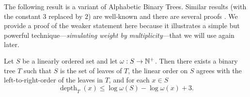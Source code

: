 \documentclass{patmorin}
\renewcommand{\le}{\leqslant}
\newcommand{\pat}[1]{\textcolor{Magenta}{PaMo: #1}}
\newcommand{\piotr}[1]{\textcolor{red}{PiMi: #1}}
\DeclareMathOperator{\depth}{depth}
\newcommand{\defin}[1]{\emph{\textcolor{brightmaroon}{#1}}}
\begin{document}
  The following result is a variant of Alphabetic Binary Trees. Similar results (with the constant $3$ replaced by $2$) are well-known and there are several proofs \cite{knuth:art_iii,mehlhorn:nearly,gilbert.moore:variable_length}. We provide a proof of the weaker statement here because it illustrates a simple but powerful technique---\defin{simulating weight by multiplicity}---that we will use again later.

   \begin{lem}\label{shannon_fano_elias_tree}\label{shannon_fano_elias}
    Let $S$ be a linearly ordered set and let $\omega:S\to\mathbb{N}^+$. Then there exists a binary tree $T$ such that $S$ is the set of leaves of $T$,
    the linear order on $S$ agrees with the left-to-right-order of the leaves in $T$, and for each $x\in S$
    \[
    \depth_{T}(x)\le \log\omega(S) - \log\omega(x) + 3.
    \]
  \end{lem}

\end{document}
